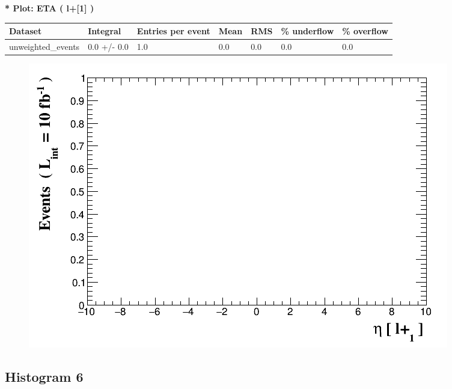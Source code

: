 \documentclass[a4paper, 10pt]{article}
\begin{document}
\textbf{* Plot: ETA ( l+[1] ) }\\
   \begin{table}[H]
  \begin{center}
    \begin{tabular}{|m{23.0mm}|m{23.0mm}|m{18.0mm}|m{19.0mm}|m{19.0mm}|m{19.0mm}|m{19.0mm}|}
      \hline
      {\cellcolor{yellow}         Dataset}& {\cellcolor{yellow}         Integral}& {\cellcolor{yellow}         Entries per event}& {\cellcolor{yellow}         Mean}& {\cellcolor{yellow}         RMS}& {\cellcolor{yellow}         \% underflow}& {\cellcolor{yellow}         \% overflow}\\
      \hline
      {\cellcolor{white}         unweighted\_events}& {\cellcolor{white}         0.0 +/\-- 0.0}& {\cellcolor{white}         1.0}& {\cellcolor{white}         0.0}& {\cellcolor{white}         0.0}& {\cellcolor{green}         0.0}& {\cellcolor{green}         0.0}\\
\hline
    \end{tabular}
  \end{center}
\end{table}

\begin{figure}[H]
  \begin{center}
    \includegraphics[scale=0.45]{selection_4.png}\\
\caption{   }
  \end{center}
\end{figure}
      \newpage
\subsection{ Histogram 6}
\end{document}
